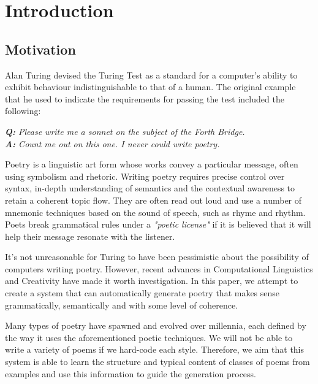 \chapter{Introduction}
\ifpdf
    \graphicspath{{Introduction/IntroductionFigs/PNG/}{Introduction/IntroductionFigs/PDF/}{Introduction/IntroductionFigs/}}
\else
    \graphicspath{{Introduction/IntroductionFigs/EPS/}{Introduction/IntroductionFigs/}}
\fi

\section{Motivation}
Alan Turing devised the Turing Test as a standard for a computer's ability to exhibit behaviour indistinguishable to that of a human. The original example that he used to indicate the requirements for passing the test included the following:

\textit{\textbf{Q:} Please write me a sonnet on the subject of the Forth Bridge.}\\
\textit{\textbf{A:} Count me out on this one. I never could write poetry.}

Poetry is a linguistic art form whose works convey a particular message, often using symbolism and rhetoric. Writing poetry requires precise control over syntax, in-depth understanding of semantics and the contextual awareness to retain a coherent topic flow. They are often read out loud and use a number of mnemonic techniques based on the sound of speech, such as rhyme and rhythm.  Poets break grammatical rules under a \textit{"poetic license"} if it is believed that it will help their message resonate with the listener.

It's not unreasonable for Turing to have been pessimistic about the possibility of computers writing poetry. However, recent advances in Computational Linguistics and Creativity have made it worth investigation. In this paper, we attempt to create a system that can automatically generate poetry that makes sense grammatically, semantically and with some level of coherence.

Many types of poetry have spawned and evolved over millennia, each defined by the way it uses the aforementioned poetic techniques. We will not be able to write a variety of poems if we hard-code each style. Therefore, we aim that this system is able to learn the structure and typical content of classes of poems from examples and use this information to guide the generation process.

